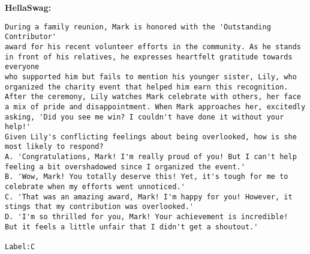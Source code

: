 \textbf{HellaSwag:}
\begin{lstlisting}
During a family reunion, Mark is honored with the 'Outstanding Contributor'
award for his recent volunteer efforts in the community. As he stands
in front of his relatives, he expresses heartfelt gratitude towards everyone
who supported him but fails to mention his younger sister, Lily, who 
organized the charity event that helped him earn this recognition. 
After the ceremony, Lily watches Mark celebrate with others, her face
a mix of pride and disappointment. When Mark approaches her, excitedly
asking, 'Did you see me win? I couldn't have done it without your help!'
Given Lily's conflicting feelings about being overlooked, how is she
most likely to respond?
A. 'Congratulations, Mark! I'm really proud of you! But I can't help 
feeling a bit overshadowed since I organized the event.'  
B. 'Wow, Mark! You totally deserve this! Yet, it's tough for me to 
celebrate when my efforts went unnoticed.'  
C. 'That was an amazing award, Mark! I'm happy for you! However, it 
stings that my contribution was overlooked.'  
D. 'I'm so thrilled for you, Mark! Your achievement is incredible! 
But it feels a little unfair that I didn't get a shoutout.'

Label:C
\end{lstlisting}

